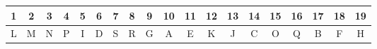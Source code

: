 \vspace{-\topsep}\vspace{-2.5pt}
\begin{assign}
\item \Dtma
\end{assign}

\vspace{-13.5pt}
\noindent\parbox{.5\textwidth}{%
\begin{assign}
\setcounter{enumi}{1}
\item \Trlb{\TXT}
\begin{detail}
\item {}
\item {}
\item[]
\end{detail}
\end{assign}}%
\parbox{.5\textwidth}{%
\begin{assign}
\setcounter{enumi}{2}
\item \Trlb{\BNN}
\begin{detail}
\item \E{\Zav}
\item \E{\Zaw}
\item \E{\Zax}
\end{detail}
\end{assign}}%

\vspace{3pt}
\Na
\Noex

\vspace{\topsep}
\Nb
\Infm{\BNN}{\Fma}

\Indi{\D{-}}{\Zba}
\Dvdl

\Zbaa\Sp
\Zbab
\By{\JnXu}
\Post
\newpage
\Ante
\Soln
\begin{assign}
\item
\begin{tabular}{|c|c|c|c|c|c|c|c|c|c|c|c|c|c|c|c|c|c|c|}\hline
1&2&3&4&5&6&7&8&9&10&11&12&13&14&15&16&17&18&19\\\hline\hline
L&M&N&P&I&D&S&R&G&A&E&K&J&C&O&Q&B&F&H\\\hline
\end{tabular}
\setcounter{index}{20}
\item
\begin{detail}
\item \E{\Zat}
\item \E{\Zau}
\end{detail}
\item
\begin{detail}
\item {}
\item {}
\item {}
\end{detail}
\end{assign}
%

